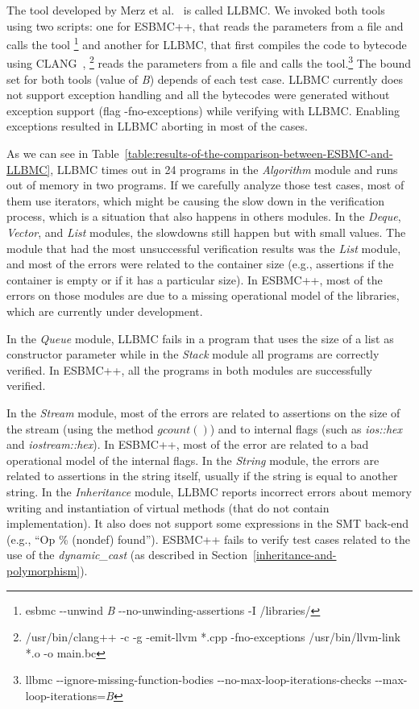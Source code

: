 \documentclass[conference]{IEEEtran}
\begin{document}
The tool developed by Merz et al.~\cite{Florian12} is called LLBMC.
We invoked both tools using two scripts: one for ESBMC++, that reads
the parameters from a file and calls the tool%
\footnote[1]{esbmc -\/-unwind \textit{B}  -\/-no-unwinding-assertions -I /libraries/}
and another for LLBMC, that first compiles the code to bytecode using CLANG~\cite{CLANG},%
\footnote[2]{/usr/bin/clang++ -c -g -emit-llvm *.cpp -fno-exceptions \newline /usr/bin/llvm-link *.o -o main.bc}
reads the parameters from a file and calls the tool.\footnote[3]
{llbmc -\/-ignore-missing-function-bodies \newline -\/-no-max-loop-iterations-checks -\/-max-loop-iterations=\textit{B}}
The bound set for both tools (value of \textit{B}) depends of each test case.
LLBMC currently does not support exception handling and all the bytecodes were generated without
exception support (flag -fno-exceptions) while verifying with LLBMC.
Enabling exceptions resulted in LLBMC aborting in most of the cases.

As we can see in Table~\ref{table:results-of-the-comparison-between-ESBMC-and-LLBMC},
LLBMC times out in 24 programs in the \textit{Algorithm} module and
runs out of memory in two programs. If we carefully analyze those test cases,
most of them use iterators, which might be causing the slow down
in the verification process, which is a situation that also happens in others modules.
In the \textit{Deque}, \textit{Vector}, and \textit{List} modules,
the slowdowns still happen but with small values. The module that had the
most unsuccessful verification results was the \textit{List} module, and most of the
errors were related to the container size (e.g., assertions if the container
is empty or if it has a particular size). In ESBMC++, most of the errors on
those modules are due to a missing operational model
of the libraries, which are currently under development.

In the \textit{Queue} module, LLBMC fails in a program that uses the size of a list
as constructor parameter while in the \textit{Stack} module all programs are correctly verified.
In ESBMC++, all the programs in both modules are successfully verified.

In the \textit{Stream} module, most of the errors are related to assertions on the size
of the stream (using the method $gcount\left(\right)$) and to internal flags (such as
\textit{ios::hex} and \textit{iostream::hex}). In ESBMC++, most of the error are related
to a bad operational model of the internal flags. In the \textit{String} module, the errors are related
to assertions in the string itself, usually if the string is equal to another string.
In the \textit{Inheritance} module, LLBMC reports incorrect errors about memory writing and
instantiation of virtual methods (that do not contain implementation).
It also does not support some expressions in the SMT back-end (e.g.,
``Op \% (nondef) found''). ESBMC++ fails to verify test cases related to the use of the
\textit{dynamic\_cast} (as described in Section~\ref{inheritance-and-polymorphism}).
\end{document}
